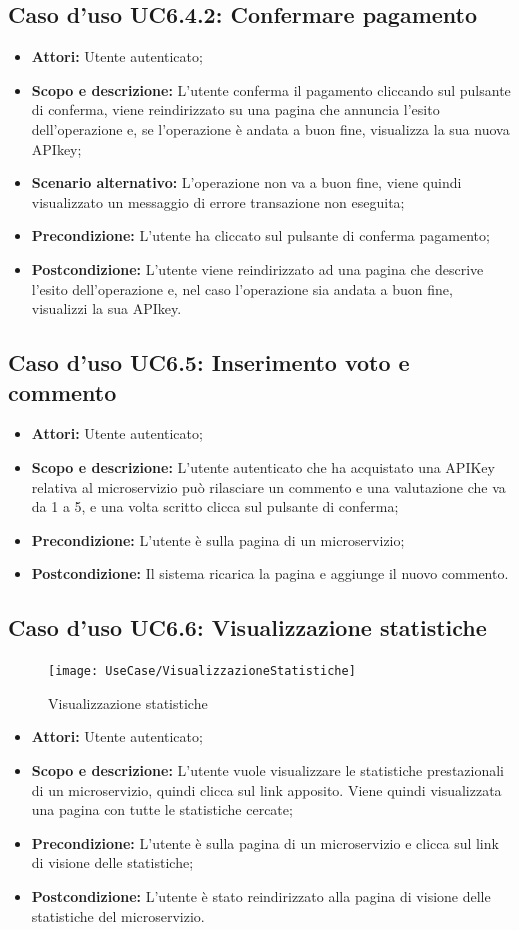 \documentclass[12pt,a4paper,titlepage]{article}
\begin{document}
\subsection{Caso d'uso UC6.4.2: Confermare pagamento}
\begin{itemize}
	\item \textbf{Attori: }Utente autenticato;
	\item \textbf{Scopo e descrizione: }L'utente conferma il pagamento cliccando sul pulsante di conferma, viene reindirizzato su una pagina che annuncia l'esito dell'operazione e, se l'operazione è andata a buon fine, visualizza la sua nuova APIkey;
	\item \textbf{Scenario alternativo: }L'operazione non va a buon fine, viene quindi visualizzato un messaggio di errore transazione non eseguita;
	\item \textbf{Precondizione: }L'utente ha cliccato sul pulsante di conferma pagamento;
	\item \textbf{Postcondizione: }L'utente viene reindirizzato ad una pagina che descrive l'esito dell'operazione e, nel caso l'operazione sia andata a buon fine, visualizzi la sua APIkey.
\end{itemize}
\subsection{Caso d'uso UC6.5: Inserimento voto e commento}
\begin{itemize}
	\item \textbf{Attori: }Utente autenticato;
	\item \textbf{Scopo e descrizione: }L'utente autenticato che ha acquistato una APIKey relativa al microservizio può rilasciare un commento e una valutazione che va da 1 a 5, e una volta scritto clicca sul pulsante di conferma;
	\item \textbf{Precondizione: }L'utente è sulla pagina di un microservizio;
	\item \textbf{Postcondizione: }Il sistema ricarica la pagina e aggiunge il nuovo commento.
\end{itemize}
\subsection{Caso d'uso UC6.6: Visualizzazione statistiche }
\begin{figure}[H]
	\centering
	\texttt{[image: UseCase/VisualizzazioneStatistiche]}
	\caption{Visualizzazione statistiche}
\end{figure}
\begin{itemize}
	\item \textbf{Attori: }Utente autenticato;
	\item \textbf{Scopo e descrizione: }L'utente vuole visualizzare le statistiche prestazionali di un microservizio, quindi clicca sul link apposito. Viene quindi visualizzata una pagina con tutte le statistiche cercate;
	\item \textbf{Precondizione: }L'utente è sulla pagina di un microservizio e clicca sul link di visione delle statistiche;
	\item \textbf{Postcondizione: }L'utente è stato reindirizzato alla pagina di visione delle statistiche del microservizio.
\end{itemize}
\end{document}
